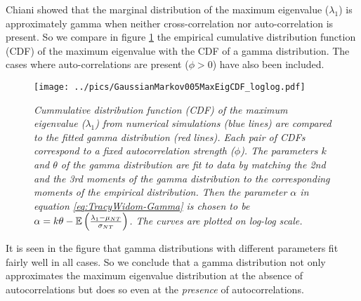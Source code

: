 Chiani showed that the marginal distribution of the maximum eigenvalue
($\lambda_1$) is approximately gamma when neither cross-correlation
nor auto-correlation is present\cite{Chiani2012}. So we compare
in figure \ref{fig:GaussianMarkov005MaxEigCDF_loglog} the empirical
cumulative distribution function (CDF) of the maximum eigenvalue 
with the CDF of a gamma distribution. The cases where
auto-correlations are present ($\phi > 0$) have also been included.
\begin{figure}
  \begin{center}
    \texttt{[image: ../pics/GaussianMarkov005MaxEigCDF\_loglog.pdf]}
  \end{center}
  \caption{\small \it Cummulative distribution function (CDF) of the
    maximum eigenvalue ($\lambda_1$) from numerical simulations (blue
    lines) are compared to the fitted gamma distribution (red
    lines). Each pair of CDFs correspond to a fixed autocorrelation
    strength ($\phi$). The parameters $k$ and $\theta$ of the gamma
    distribution are fit to data by matching the 2nd and the 3rd
    moments of the gamma distribution to the corresponding moments of
    the empirical distribution. Then the parameter $\alpha$ in
    equation \ref{eq:TracyWidom-Gamma} is chosen to be $\alpha =
    k\theta - \mathbb{E}\left({\lambda_1 - \mu_{NT} \over
        \sigma_{NT}}\right)$. The curves are plotted on log-log
    scale.}
  \label{fig:GaussianMarkov005MaxEigCDF_loglog}
\end{figure}
It is seen in the figure that gamma distributions with different
parameters fit fairly well in all cases. So we conclude that a
gamma distribution not only approximates the maximum eigenvalue
distribution at the absence of autocorrelations but does so even at
the {\it presence} of autocorrelations.

